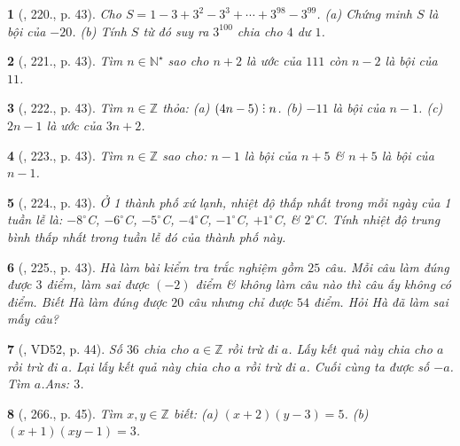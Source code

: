 \documentclass{article}
\newtheorem{baitoan}{}
\DeclareRobustCommand{\divby}{%
	\mathrel{\vbox{\baselineskip.65ex\lineskiplimit0pt\hbox{.}\hbox{.}\hbox{.}}}%
}
\begin{document}
\begin{baitoan}[\cite{Tuyen_Toan_6}, 220., p. 43]
	Cho $S = 1 - 3 + 3^2 - 3^3 + \cdots + 3^{98} - 3^{99}$. (a) Chứng minh $S$ là bội của $-20$. (b) Tính $S$ từ đó suy ra $3^{100}$ chia cho $4$ dư $1$.
\end{baitoan}

\begin{baitoan}[\cite{Tuyen_Toan_6}, 221., p. 43]
	Tìm $n\in\mathbb{N}^\star$ sao cho $n + 2$ là ước của $111$ còn $n - 2$ là bội của $11$.
\end{baitoan}

\begin{baitoan}[\cite{Tuyen_Toan_6}, 222., p. 43]
	Tìm $n\in\mathbb{Z}$ thỏa: (a) $(4n - 5)\divby n$. (b) $-11$ là bội của $n - 1$. (c) $2n - 1$ là ước của $3n + 2$.
\end{baitoan}

\begin{baitoan}[\cite{Tuyen_Toan_6}, 223., p. 43]
	Tìm $n\in\mathbb{Z}$ sao cho: $n - 1$ là bội của $n + 5$ \& $n + 5$ là bội của $n - 1$.
\end{baitoan}

\begin{baitoan}[\cite{Tuyen_Toan_6}, 224., p. 43]
	Ở 1 thành phố xứ lạnh, nhiệt độ thấp nhất trong mỗi ngày của 1 tuần lễ là: $-8^\circ$C, $-6^\circ$C, $-5^\circ$C, $-4^\circ$C, $-1^\circ$C, $+1^\circ$C, \& $2^\circ$C. Tính nhiệt độ trung bình thấp nhất trong tuần lễ đó của thành phố này. 
\end{baitoan}

\begin{baitoan}[\cite{Tuyen_Toan_6}, 225., p. 43]
	Hà làm bài kiểm tra trắc nghiệm gồm $25$ câu. Mỗi câu làm đúng được $3$ điểm, làm sai được $(-2)$ điểm \& không làm câu nào thì câu ấy không có điểm. Biết Hà làm đúng được $20$ câu nhưng chỉ được $54$ điểm. Hỏi Hà đã làm sai mấy câu?
\end{baitoan}

\begin{baitoan}[\cite{Binh_Toan_6_tap_1}, VD52, p. 44]
	Số $36$ chia cho $a\in\mathbb{Z}$ rồi trừ đi $a$. Lấy kết quả này chia cho $a$ rồi trừ đi $a$. Lại lấy kết quả này chia cho $a$ rồi trừ đi $a$. Cuối cùng ta được số $-a$. Tìm $a$.\hfill{\sf Ans:} $3$.
\end{baitoan}

\begin{baitoan}[\cite{Binh_Toan_6_tap_1}, 266., p. 45]
	Tìm $x,y\in\mathbb{Z}$ biết: (a) $(x + 2)(y - 3) = 5$. (b) $(x + 1)(xy - 1) = 3$.
\end{baitoan}
\end{document}
